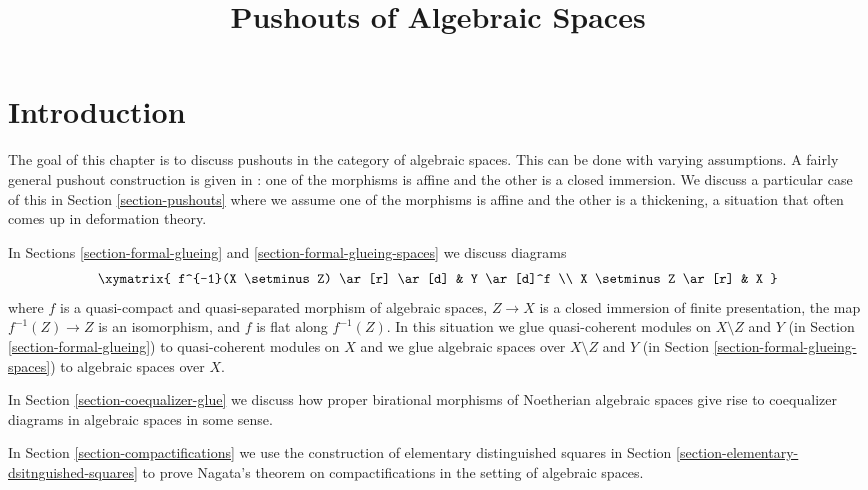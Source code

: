 

%


\title{Pushouts of Algebraic Spaces}


\maketitle

\label{section-phantom}

\tableofcontents

\section{Introduction}
\label{section-introduction}

\noindent
The goal of this chapter is to discuss pushouts in the category of
algebraic spaces. This can be done with varying assumptions.
A fairly general pushout construction is given in \cite{Temkin-Tyomkin}:
one of the morphisms is affine and the other is a closed immersion.
We discuss a particular case of this in Section \ref{section-pushouts}
where we assume one of the morphisms is affine and the other is a
thickening, a situation that often comes up in deformation theory.

\medskip\noindent
In Sections \ref{section-formal-glueing} and
\ref{section-formal-glueing-spaces} we discuss diagrams
$$
\xymatrix{
f^{-1}(X \setminus Z) \ar[r] \ar[d] & Y \ar[d]^f \\
X \setminus Z \ar[r] & X
}
$$
where $f$ is a quasi-compact and quasi-separated morphism of
algebraic spaces, $Z \to X$ is a closed immersion of finite presentation,
the map $f^{-1}(Z) \to Z$ is an isomorphism, and
$f$ is flat along $f^{-1}(Z)$. In this situation we glue
quasi-coherent modules on $X \setminus Z$ and $Y$
(in Section \ref{section-formal-glueing}) to quasi-coherent modules on $X$
and we glue algebraic spaces over $X \setminus Z$ and $Y$
(in Section \ref{section-formal-glueing-spaces}) to algebraic spaces over $X$.

\medskip\noindent
In Section \ref{section-coequalizer-glue} we discuss how proper birational
morphisms of Noetherian algebraic spaces give rise to coequalizer diagrams
in algebraic spaces in some sense.

\medskip\noindent
In Section \ref{section-compactifications} we use the construction
of elementary distinguished squares
in Section \ref{section-elementary-dsitnguished-squares}
to prove Nagata's theorem on compactifications in the setting
of algebraic spaces.







